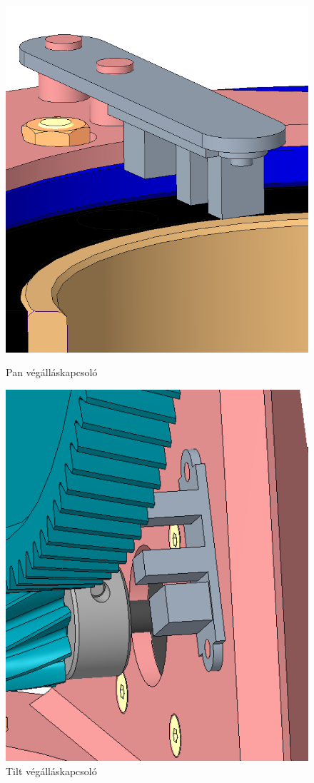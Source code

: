 \documentclass[12pt,a4paper]{article}
\begin{document}
\begin{figure}
	\centering
	\begin{minipage}{.5\textwidth}
		\centering
		\includegraphics[width=.7\linewidth]{mech_vegallas1}
		\caption{Pan végálláskapcsoló}
		\label{fig:mech_vegallas1}
	\end{minipage}%
	\begin{minipage}{.5\textwidth}
		\centering
		\includegraphics[width=.7\linewidth]{mech_vegallas2}
		\caption{Tilt végálláskapcsoló}
		\label{fig:mech_vegallas2}
	\end{minipage}
\end{figure}
\end{document}
